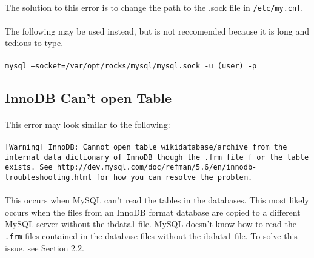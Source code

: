 \documentclass[12pt]{article}
\begin{document}
\paragraph{}The solution to this error is to change the path to the .sock file in {\tt/etc/my.cnf}.
\paragraph{}The following may be used instead, but is not reccomended because it is long and tedious to type.
\paragraph{}{\tt mysql --socket=/var/opt/rocks/mysql/mysql.sock  -u (user) -p}

\subsection{InnoDB Can't open Table}
\paragraph{} This error may look similar to the following: 
\paragraph{}{\tt [Warning] InnoDB: Cannot open table wikidatabase/archive from the internal data dictionary of InnoDB though the .frm file f\
  or the table exists. See http://dev.mysql.com/doc/refman/5.6/en/innodb-
  troubleshooting.html for how you can resolve the problem.} 
\paragraph{}This occurs when MySQL can't read the tables in the databases. This most likely occurs when the files from an InnoDB format database are copied to a different MySQL server without the ibdata1 file. MySQL doesn't know how to read the {\tt.frm} files contained in the database files without the ibdata1 file. To solve this issue, see Section 2.2.
\end{document}
